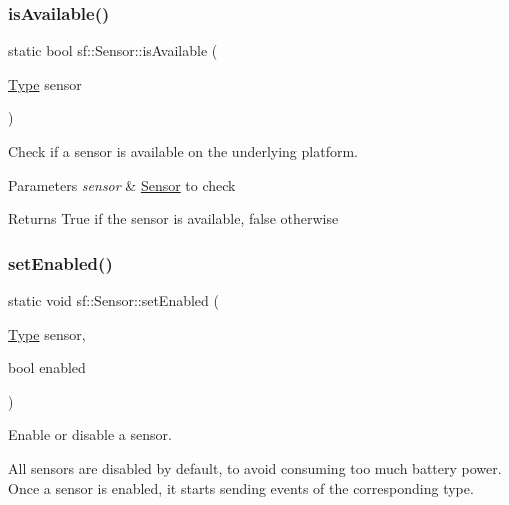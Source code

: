 \subsubsection{\texorpdfstring{isAvailable()}{isAvailable()}}
{\footnotesize\ttfamily static bool sf\+::\+Sensor\+::is\+Available (\begin{DoxyParamCaption}\item[{\mbox{\hyperlink{classsf_1_1_sensor_a687375af3ab77b818fca73735bcaea84}{Type}}}]{sensor }\end{DoxyParamCaption})\hspace{0.3cm}{\ttfamily [static]}}



Check if a sensor is available on the underlying platform. 


\begin{DoxyParams}{Parameters}
{\em sensor} & \mbox{\hyperlink{classsf_1_1_sensor}{Sensor}} to check\\
\hline
\end{DoxyParams}
\begin{DoxyReturn}{Returns}
True if the sensor is available, false otherwise \begin{DoxyVerb}\end{DoxyVerb}
 
\end{DoxyReturn}
\mbox{\label{classsf_1_1_sensor_afb31c5697d2e0a5fec70d702ec1d6cd9}} 
\subsubsection{\texorpdfstring{setEnabled()}{setEnabled()}}
{\footnotesize\ttfamily static void sf\+::\+Sensor\+::set\+Enabled (\begin{DoxyParamCaption}\item[{\mbox{\hyperlink{classsf_1_1_sensor_a687375af3ab77b818fca73735bcaea84}{Type}}}]{sensor,  }\item[{bool}]{enabled }\end{DoxyParamCaption})\hspace{0.3cm}{\ttfamily [static]}}



Enable or disable a sensor. 

All sensors are disabled by default, to avoid consuming too much battery power. Once a sensor is enabled, it starts sending events of the corresponding type.

